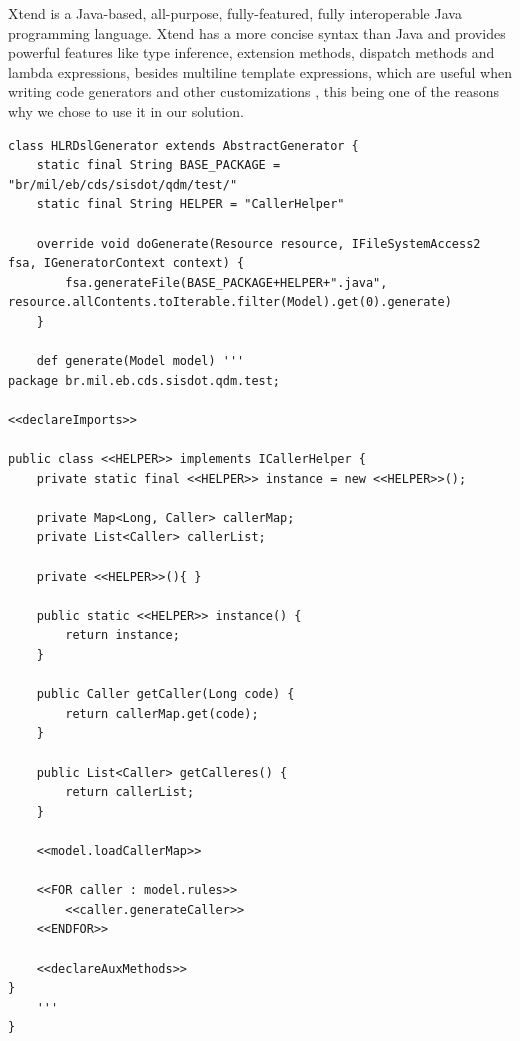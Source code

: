 \documentclass[AMA,STIX1COL]{WileyNJD-v2}
\begin{document}

Xtend is a Java-based, all-purpose, fully-featured, fully interoperable Java programming language. Xtend has a more concise syntax than Java and provides powerful features like type inference, extension methods, dispatch methods and lambda expressions, besides multiline template expressions, which are useful when writing code generators and other customizations \cite{bettini2016}, this being one of the reasons why we chose to use it in our solution.

\begin{small}
\begin{lstlisting}[frame=single, language=Xtend, caption={\it Code Generation}, label={code:xtend_generator}]
class HLRDslGenerator extends AbstractGenerator {
	static final String BASE_PACKAGE = "br/mil/eb/cds/sisdot/qdm/test/"
	static final String HELPER = "CallerHelper"

	override void doGenerate(Resource resource, IFileSystemAccess2 fsa, IGeneratorContext context) {		
		fsa.generateFile(BASE_PACKAGE+HELPER+".java", resource.allContents.toIterable.filter(Model).get(0).generate)
	}

	def generate(Model model) '''
package br.mil.eb.cds.sisdot.qdm.test;
		
<<declareImports>>

public class <<HELPER>> implements ICallerHelper {
	private static final <<HELPER>> instance = new <<HELPER>>();
	
	private Map<Long, Caller> callerMap;
	private List<Caller> callerList;
	
	private <<HELPER>>(){ }
	
	public static <<HELPER>> instance() {
		return instance;
	}
	
	public Caller getCaller(Long code) {
		return callerMap.get(code);
	}
	
	public List<Caller> getCalleres() {
		return callerList;
	}
	
	<<model.loadCallerMap>>
	
	<<FOR caller : model.rules>>
		<<caller.generateCaller>>
	<<ENDFOR>>
			
	<<declareAuxMethods>>
}
	'''
}
\end{lstlisting}
\end{small}
\end{document}
